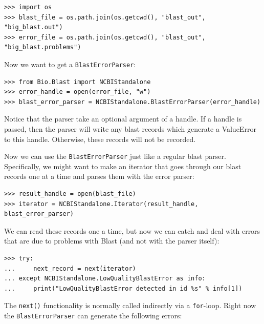 \documentclass{report}
\begin{document}
\begin{verbatim}
>>> import os
>>> blast_file = os.path.join(os.getcwd(), "blast_out", "big_blast.out")
>>> error_file = os.path.join(os.getcwd(), "blast_out", "big_blast.problems")
\end{verbatim}

Now we want to get a \verb|BlastErrorParser|:

\begin{verbatim}
>>> from Bio.Blast import NCBIStandalone
>>> error_handle = open(error_file, "w")
>>> blast_error_parser = NCBIStandalone.BlastErrorParser(error_handle)
\end{verbatim}

Notice that the parser take an optional argument of a handle. If a handle is passed, then the parser will write any blast records which generate a ValueError to this handle. Otherwise, these records will not be recorded.

Now we can use the \verb|BlastErrorParser| just like a regular blast parser. Specifically, we might want to make an iterator that goes through our blast records one at a time and parses them with the error parser:

\begin{verbatim}
>>> result_handle = open(blast_file)
>>> iterator = NCBIStandalone.Iterator(result_handle, blast_error_parser)
\end{verbatim}

We can read these records one a time, but now we can catch and deal with errors that are due to problems with Blast (and not with the parser itself):

\begin{verbatim}
>>> try:
...     next_record = next(iterator)
... except NCBIStandalone.LowQualityBlastError as info:
...     print("LowQualityBlastError detected in id %s" % info[1])
\end{verbatim}

The \verb|next()| functionality is normally called indirectly via a \verb|for|-loop.
Right now the \verb|BlastErrorParser| can generate the following errors:
\end{document}
